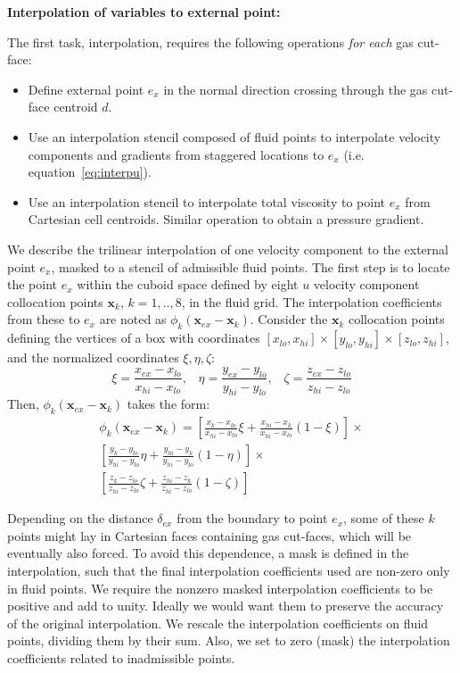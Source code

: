 \documentclass[12pt]{article}
\begin{document}
\bigskip
\noindent
\textbf{Interpolation of variables to external point:}
\bigskip

The first task, interpolation, requires the following operations \textit{for each} gas cut-face:
%
\begin{itemize}
   \item Define external point $e_x$ in the normal direction crossing through the gas cut-face centroid $d$.
   \item Use an interpolation stencil composed of fluid points to interpolate velocity components and gradients from staggered locations to $e_x$ (i.e. equation~\eqref{eq:interpu}).
   \item Use an interpolation stencil to interpolate total viscosity to point $e_x$ from Cartesian cell centroids. Similar operation to obtain a pressure gradient.
\end{itemize}
%

We describe the trilinear interpolation of one velocity component to the external point $e_x$, masked to a stencil of admissible fluid points.
The first step is to locate the point $e_x$ within the cuboid space defined by  eight $u$ velocity component collocation points $\mathbf{x}_k$, $k=1,..,8$, in the fluid grid. The interpolation coefficients from these to $e_x$ are noted as $\phi_k(\mathbf{x}_{ex}-\mathbf{x}_k)$. Consider the $\mathbf{x}_k$ collocation points defining the vertices of a box with coordinates $[x_{lo},x_{hi}] \times [ y_{lo},y_{hi}] \times [z_{lo} , z_{hi}]$, and the normalized coordinates $\xi,\eta,\zeta$:
%
\begin{equation}
   \xi = \frac{x_{ex}-x_{lo}}{x_{hi}-x_{lo}}, \; \; \;  \eta = \frac{y_{ex}-y_{lo}}{y_{hi}-y_{lo}}, \; \; \; \zeta = \frac{z_{ex}-z_{lo}}{z_{hi}-z_{lo}}
\end{equation}
%
Then, $\phi_k(\mathbf{x}_{ex}-\mathbf{x}_k)$ takes the form:
%
\begin{eqnarray}
    \phi_k(\mathbf{x}_{ex}-\mathbf{x}_k) =
    \left[ \frac{x_{k}-x_{lo}}{x_{hi}-x_{lo}} \xi + \frac{x_{hi}-x_{k}}{x_{hi}-x_{lo}} (1-\xi) \right] \times \nonumber \\
    \left[ \frac{y_{k}-y_{lo}}{y_{hi}-y_{lo}} \eta + \frac{y_{hi}-y_{k}}{y_{hi}-y_{lo}} (1-\eta) \right] \times \nonumber \\
    \left[ \frac{z_{k}-z_{lo}}{z_{hi}-z_{lo}} \zeta + \frac{z_{hi}-z_{k}}{z_{hi}-z_{lo}} (1-\zeta) \right] \; \; \; \; \;
\end{eqnarray}
%

Depending on the distance $\delta_{ex}$ from the boundary to point $e_x$, some of these $k$ points might lay in Cartesian faces containing gas cut-faces, which will be eventually also forced. To avoid this dependence, a mask is defined in the interpolation, such that the final interpolation coefficients used are non-zero only in fluid points. We require the nonzero masked interpolation coefficients to be positive and add to unity. Ideally we would want them to preserve the accuracy of the original interpolation.
We rescale the interpolation coefficients on fluid points, dividing them by their sum. Also, we set to zero (mask) the interpolation coefficients related to inadmissible points.
\end{document}
